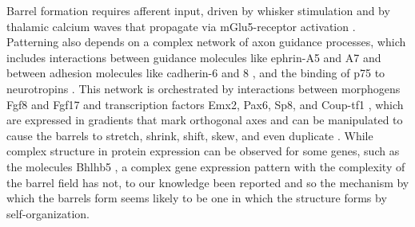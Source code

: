 \documentclass[9pt,twocolumn,twoside,lineno]{pnas-new}
\begin{document}
%

Barrel formation requires afferent input, driven by whisker stimulation and by
thalamic calcium waves that propagate via mGlu5-receptor activation
\citep{anton-bolanos_prenatal_2019}.
Patterning also depends on a complex network of axon guidance processes, which
includes interactions between guidance molecules like ephrin-A5 and A7
\citep{miller_epha7-ephrin-a5_2006} and between adhesion molecules like
cadherin-6 and 8 \citep{bishop_regulation_2000}, and the
binding of p75 to neurotropins
\citep{bishop_distinct_2002}.
%
This network is orchestrated by interactions between morphogens Fgf8 and Fgf17
and transcription factors Emx2, Pax6, Sp8, and Coup-tf1
\citep{shimogori_fibroblast_2005,bishop_regulation_2000}, which are expressed
in gradients that mark orthogonal axes and can be manipulated to cause the
barrels to stretch, shrink, shift, skew, and even duplicate \cite{assimacopoulos_fibroblast_2012}.
%
While complex structure in protein expression can be observed for some genes,
such as the molecules Bhlhb5 \citep{joshi_bhlhb5_2008}, a complex gene
expression pattern with the complexity of the barrel field has not, to our
knowledge been reported and so the mechanism by which the barrels form seems
likely to be one in which the structure forms by self-organization.
\end{document}

